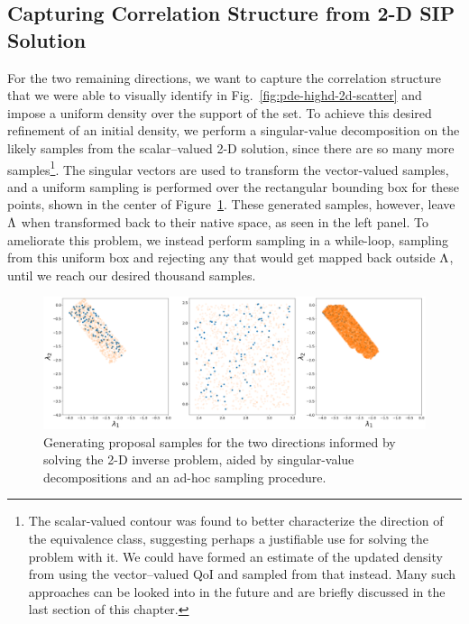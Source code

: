 \FloatBarrier
\subsection{Capturing Correlation Structure from 2-D SIP Solution}
For the two remaining directions, we want to capture the correlation structure that we were able to visually identify in Fig.~\ref{fig:pde-highd-2d-scatter} and impose a uniform density over the support of the set.
To achieve this desired refinement of an initial density, we perform a singular-value decomposition on the likely samples from the scalar--valued 2-D solution, since there are so many more samples\footnote{ The scalar-valued contour was found to better characterize the direction of the equivalence class, suggesting perhaps a justifiable use for solving the problem with it. We could have formed an estimate of the updated density from using the vector--valued QoI and sampled from that instead. Many such approaches can be looked into in the future and are briefly discussed in the last section of this chapter.}.
The singular vectors are used to transform the vector-valued samples, and a uniform sampling is performed over the rectangular bounding box for these points, shown in the center of Figure~\ref{fig:pde-highd-2d-study}.
These generated samples, however, leave ${\Lambda}$ when transformed back to their native space, as seen in the left panel.
To ameliorate this problem, we instead perform sampling in a while-loop, sampling from this uniform box and rejecting any that would get mapped back outside ${\Lambda}$, until we reach our desired thousand samples.


\begin{figure}[htbp]
\centering
  \includegraphics[width=0.95\linewidth]{figures/pde-highd/pde-highd-alt_initial_D2_m100}
\caption{
Generating proposal samples for the two directions informed by solving the 2-D inverse problem, aided by singular-value decompositions and an ad-hoc sampling procedure.
}
\label{fig:pde-highd-2d-study}
\end{figure}

